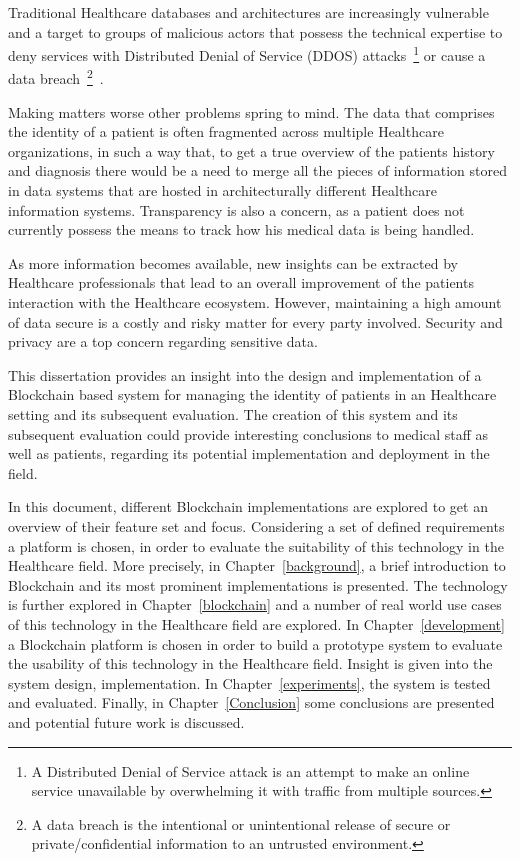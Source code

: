 Traditional Healthcare databases and architectures are increasingly vulnerable
and a target to groups of malicious actors that possess the technical expertise
to deny services with Distributed Denial of Service (DDOS) attacks~\footnote{A
Distributed Denial of Service attack is an attempt to make an online service
unavailable by overwhelming it with traffic from multiple sources.} or cause a
data breach~\footnote{A data breach is the intentional or unintentional release
of secure or private/confidential information to an untrusted
environment.}~\cite{mcCoy2018}. 

Making matters worse other problems spring to mind. The data that comprises the
identity of a patient is often fragmented across multiple Healthcare
organizations, in such a way that, to get a true overview of the patients
history and diagnosis there would be a need to merge all the pieces of
information stored in data systems that are hosted in architecturally different
Healthcare information systems. Transparency is also a concern, as a patient
does not currently possess the means to track how his medical data is being
handled.

As more information becomes available, new insights can be extracted by
Healthcare professionals that lead to an overall improvement of the patients
interaction with the Healthcare ecosystem. However, maintaining a high amount
of data secure is a costly and risky matter for every party involved. Security
and privacy are a top concern regarding sensitive data. 

This dissertation provides an insight into the design and implementation of a
Blockchain based system for managing the identity of patients in an Healthcare
setting and its subsequent evaluation. The creation of this system and its
subsequent evaluation could provide interesting conclusions to medical staff as
well as patients, regarding its potential implementation and deployment in the
field.

In this document, different Blockchain implementations are explored to get an
overview of their feature set and focus. Considering a set of defined
requirements a platform is chosen, in order to evaluate the suitability of this
technology in the Healthcare field. More precisely, in
Chapter~\ref{background}, a brief introduction to Blockchain and its most
prominent implementations is presented. The technology is further explored in
Chapter~\ref{blockchain} and a number of real world use cases of this
technology in the Healthcare field are explored.  In Chapter~\ref{development}
a Blockchain platform is chosen in order to build a prototype system to
evaluate the usability of this technology in the Healthcare field. Insight is
given into the system design, implementation. In Chapter~\ref{experiments}, the
system is tested and evaluated. Finally, in Chapter~\ref{Conclusion} some
conclusions are presented and potential future work is discussed.
